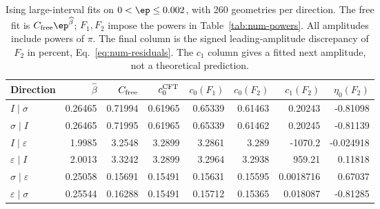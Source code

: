 \begin{table}[htbp]\centering\footnotesize
\setlength{\tabcolsep}{3.5pt}
\begin{tabular}{lrrrrrrr}\toprule
Direction & $\widehat\beta$ & $C_{\rm free}$ & $c_0^{\rm CFT}$ & $c_0(F_1)$ & $c_0(F_2)$ & $c_1(F_2)$ & $\eta_0(F_2)$\\\midrule
$I\mid \sigma$ & 0.26465 & 0.71994 & 0.61965 & 0.65339 & 0.61463 & 0.20243 & -0.81098\\
$\sigma\mid I$ & 0.26465 & 0.71995 & 0.61965 & 0.65339 & 0.61462 & 0.20245 & -0.81139\\
$I\mid \varepsilon$ & 1.9985 & 3.2548 & 3.2899 & 3.2861 & 3.289 & -1070.2 & -0.024918\\
$\varepsilon\mid I$ & 2.0013 & 3.3242 & 3.2899 & 3.2964 & 3.2938 & 959.21 & 0.11818\\
$\sigma\mid \varepsilon$ & 0.25058 & 0.15691 & 0.15491 & 0.15631 & 0.15595 & 0.0018716 & 0.67037\\
$\varepsilon\mid \sigma$ & 0.25544 & 0.16288 & 0.15491 & 0.15712 & 0.15365 & 0.018087 & -0.81285\\
\bottomrule\end{tabular}
\caption{Ising large-interval fits on $0<\ep\leq0.002$, with 260 geometries per direction. The free fit is $C_{\rm free}\ep^{\widehat\beta}$; $F_1,F_2$ impose the powers in Table~\ref{tab:num-powers}. All amplitudes include powers of $\pi$. The final column is the signed leading-amplitude discrepancy of $F_2$ in percent, Eq.~\eqref{eq:num-residuals}. The $c_1$ column gives a fitted next amplitude, not a theoretical prediction.}
\label{tab:num-ising-large}
\end{table}
